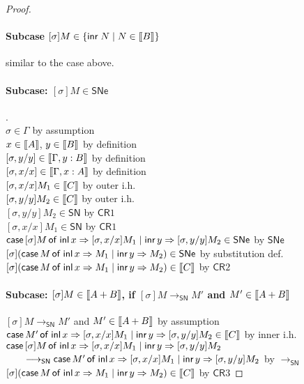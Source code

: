 \documentclass{article}
\newcommand{\SN}{\mathsf{SN}}
\newcommand{\SNe}{\mathsf{SNe}}
\newcommand{\CR}{\textsf{CR}}
\newcommand{\redSN}{\longrightarrow_\SN}
\def\lv{\mathopen{{[\kern-0.14em[}}}    %
\def\rv{\mathclose{{]\kern-0.14em]}}}   %
\newcommand{\den}[1]{\lv #1 \rv}
\begin{document}
\begin{proof}
\paragraph{Subcase $[\sigma]M \in \{\inr N \mid N \in \den{B}\}$}$\;$\\[1em]
similar to the case above.

\paragraph{Subcase: $[\sigma]M \in \SNe$}.$\;$\\
$\sigma \in \Gamma$ \hfill by assumption \\
$x \in \den{A}$, $y \in \den{B}$  \hfill by definition \\
$[\sigma, y/y] \in \den{\Gamma, y:B}$ \hfill by definition \\
$[\sigma, x/x] \in \den{\Gamma, x:A}$ \hfill by definition \\
$[\sigma, x/x]M_1 \in \den{C}$ \hfill by outer i.h. \\
$[\sigma, y/y]M_2 \in \den{C}$ \hfill by outer i.h. \\
$[\sigma, y/y]M_2 \in \SN$ \hfill by $\CR1$ \\
$[\sigma, x/x]M_1 \in \SN$ \hfill by $\CR1$ \\
$\caseof{[\sigma]M}{[\sigma, x/x]M_1}{[\sigma, y/y]M_2} \in \SNe$ \hfill by $\SNe$ \\
$[\sigma](\caseof{M}{M_1}{M_2}) \in \SNe$ \hfill by substitution def. \\
$[\sigma](\caseof{M}{M_1}{M_2}) \in \den{C}$ \hfill by $\CR2$


\paragraph{Subcase:  $[\sigma]M \in \den{A + B}$, if $[\sigma]M \redSN M'$ and $M' \in \den{A+B}$}$\;$\\
$[\sigma]M \redSN M'$ and $M' \in \den{A+B}$ \hfill by assumption \\
$\caseof{M'}{[\sigma,x/x]M_1}{[\sigma,y/y]M_2} \in \den{C}$ \hfill by inner i.h. \\
$\textsf{case}\,[\sigma]M\,\textsf{of inl}\,x \Rightarrow [\sigma,x/x]M_1 \mid \textsf{inr}\,y \Rightarrow [\sigma,y/y]M_2 $ \\
$\qquad\redSN
\caseof{M'}{[\sigma,x/x]M_1}{[\sigma,y/y]M_2}$ \hfill by $\redSN$\\
$[\sigma](\caseof{M}{M_1}{M_2}) \in \den{C}$ \hfill by $\CR3$
 \end{proof}
\end{document}
